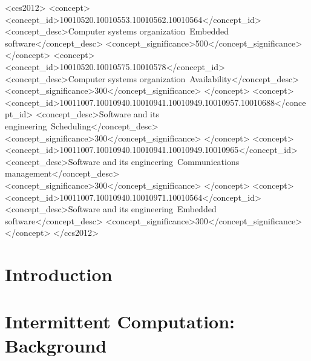 \documentclass[sigconf,anonymous,review]{acmart}
\newcommand{\TODO}[1]{{\bf \em \textcolor{red}{TODO: #1}\xspace}}
\begin{document}
\begin{CCSXML}
	<ccs2012>
	<concept>
	<concept_id>10010520.10010553.10010562.10010564</concept_id>
	<concept_desc>Computer systems organization~Embedded 
	software</concept_desc>
	<concept_significance>500</concept_significance>
	</concept>
	<concept>
	<concept_id>10010520.10010575.10010578</concept_id>
	<concept_desc>Computer systems organization~Availability</concept_desc>
	<concept_significance>300</concept_significance>
	</concept>
	<concept>
	<concept_id>10011007.10010940.10010941.10010949.10010957.10010688</concept_id>
	<concept_desc>Software and its engineering~Scheduling</concept_desc>
	<concept_significance>300</concept_significance>
	</concept>
	<concept>
	<concept_id>10011007.10010940.10010941.10010949.10010965</concept_id>
	<concept_desc>Software and its engineering~Communications 
	management</concept_desc>
	<concept_significance>300</concept_significance>
	</concept>
	<concept>
	<concept_id>10011007.10010940.10010971.10010564</concept_id>
	<concept_desc>Software and its engineering~Embedded 
	software</concept_desc>
	<concept_significance>300</concept_significance>
	</concept>
	</ccs2012>
\end{CCSXML}



\maketitle

\section{Introduction}
\label{sec:intro}




\section{Intermittent Computation: Background}
\label{sec:background}
\end{document}
